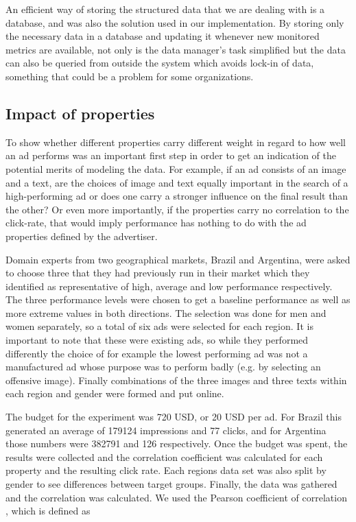 \documentclass{sig-alternate}
\begin{document}
An efficient way of storing the structured data that we are dealing with is a database, and was also the solution used in our implementation. By storing only the necessary data in a database and updating it whenever new monitored metrics are available, not only is the data manager's task simplified but the data can also be queried from outside the system which avoids lock-in of data, something that could be a problem for some organizations.

\subsection{Impact of properties}
To show whether different properties carry different weight in regard to how well an ad performs was an important first step in order to get an indication of the potential merits of modeling the data. For example, if an ad consists of an image and a text, are the choices of image and text equally important in the search of a high-performing ad or does one carry a stronger influence on the final result than the other? Or even more importantly, if the properties carry no correlation to the click-rate, that would imply performance has nothing to do with the ad properties defined by the advertiser.

Domain experts from two geographical markets, Brazil and Argentina, were asked to choose three that they had previously run in their market which they identified as representative of high, average and low performance respectively. The three performance levels were chosen to get a baseline performance as well as more extreme values in both directions. The selection was done for men and women separately, so a total of six ads were selected for each region. It is important to note that these were existing ads, so while they performed differently the choice of for example the lowest performing ad was not a manufactured ad whose purpose was to perform badly (e.g. by selecting an offensive image). Finally combinations of the three images and three texts within each region and gender were formed and put online.

The budget for the experiment was 720 USD, or 20 USD per ad. For Brazil this generated an average of 179124 impressions and 77 clicks, and for Argentina those numbers were 382791 and 126 respectively. Once the budget was spent, the results were collected and the correlation coefficient was calculated for each property and the resulting click rate. Each regions data set was also split by gender to see differences between target groups. Finally, the data was gathered and the correlation was calculated. We used the Pearson coefficient of correlation \cite{Milton2002}, which is defined as
\end{document}
